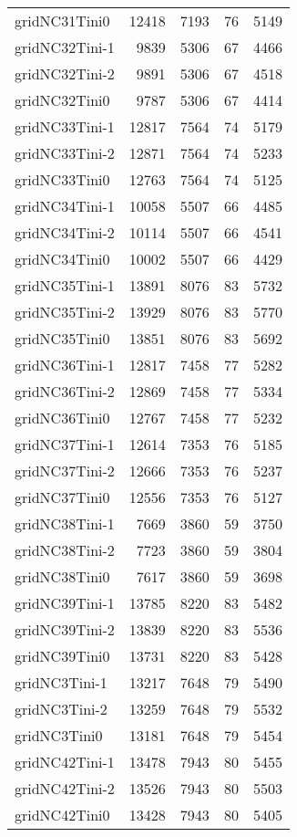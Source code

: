 \begin{longtable}{lrrrr}
gridNC31Tini0 & 12418 & 7193 & 76 & 5149 \\
gridNC32Tini-1 & 9839 & 5306 & 67 & 4466 \\
gridNC32Tini-2 & 9891 & 5306 & 67 & 4518 \\
gridNC32Tini0 & 9787 & 5306 & 67 & 4414 \\
gridNC33Tini-1 & 12817 & 7564 & 74 & 5179 \\
gridNC33Tini-2 & 12871 & 7564 & 74 & 5233 \\
gridNC33Tini0 & 12763 & 7564 & 74 & 5125 \\
gridNC34Tini-1 & 10058 & 5507 & 66 & 4485 \\
gridNC34Tini-2 & 10114 & 5507 & 66 & 4541 \\
gridNC34Tini0 & 10002 & 5507 & 66 & 4429 \\
gridNC35Tini-1 & 13891 & 8076 & 83 & 5732 \\
gridNC35Tini-2 & 13929 & 8076 & 83 & 5770 \\
gridNC35Tini0 & 13851 & 8076 & 83 & 5692 \\
gridNC36Tini-1 & 12817 & 7458 & 77 & 5282 \\
gridNC36Tini-2 & 12869 & 7458 & 77 & 5334 \\
gridNC36Tini0 & 12767 & 7458 & 77 & 5232 \\
gridNC37Tini-1 & 12614 & 7353 & 76 & 5185 \\
gridNC37Tini-2 & 12666 & 7353 & 76 & 5237 \\
gridNC37Tini0 & 12556 & 7353 & 76 & 5127 \\
gridNC38Tini-1 & 7669 & 3860 & 59 & 3750 \\
gridNC38Tini-2 & 7723 & 3860 & 59 & 3804 \\
gridNC38Tini0 & 7617 & 3860 & 59 & 3698 \\
gridNC39Tini-1 & 13785 & 8220 & 83 & 5482 \\
gridNC39Tini-2 & 13839 & 8220 & 83 & 5536 \\
gridNC39Tini0 & 13731 & 8220 & 83 & 5428 \\
gridNC3Tini-1 & 13217 & 7648 & 79 & 5490 \\
gridNC3Tini-2 & 13259 & 7648 & 79 & 5532 \\
gridNC3Tini0 & 13181 & 7648 & 79 & 5454 \\
gridNC42Tini-1 & 13478 & 7943 & 80 & 5455 \\
gridNC42Tini-2 & 13526 & 7943 & 80 & 5503 \\
gridNC42Tini0 & 13428 & 7943 & 80 & 5405 \\

\end{longtable}
